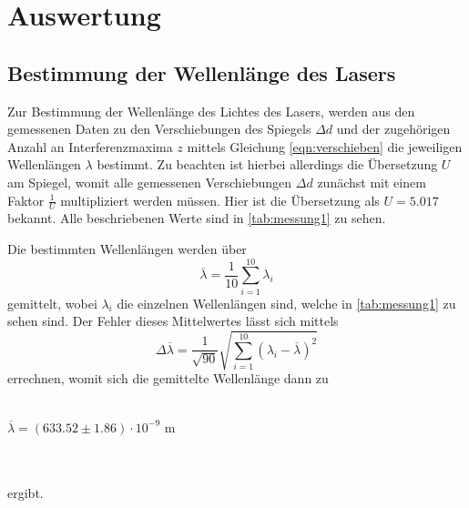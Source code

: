 \section{Auswertung}
\label{sec:Auswertung}
    \subsection{Bestimmung der Wellenlänge des Lasers}
        Zur Bestimmung der Wellenlänge des Lichtes des Lasers, werden aus den gemessenen Daten zu den Verschiebungen des Spiegels 
        $\Delta d$ und der zugehörigen Anzahl an Interferenzmaxima $z$ mittels Gleichung \eqref{eqn:verschieben} die jeweiligen 
        Wellenlängen $\lambda$ bestimmt. Zu beachten ist hierbei allerdings die Übersetzung $U$ am Spiegel, womit alle gemessenen Verschiebungen
        $\Delta d$ zunächst mit einem Faktor $\frac{1}{U}$ multipliziert werden müssen. Hier ist die Übersetzung als $U = 5.017$ bekannt.
        Alle beschriebenen Werte sind in \autoref{tab:messung1} zu sehen.
        
        Die bestimmten Wellenlängen werden über 
        \begin{equation}
        \label{eqn:mittellung}
            \overline{\lambda} = \frac{1}{10} \sum_{i = 1}^{10} \lambda_{i}
        \end{equation}
        gemittelt, wobei $\lambda_{i}$ die einzelnen Wellenlängen sind, welche in \autoref{tab:messung1} zu sehen sind.
        Der Fehler dieses Mittelwertes lässt sich mittels 
        \begin{equation}
        \label{eqn:fehler_mittel}
            \Delta \overline{\lambda} = \frac{1}{\sqrt{90}} \sqrt{\sum_{i=1}^{10} (\lambda_i - \overline{\lambda})^2}
        \end{equation}    
        errechnen, womit sich die gemittelte Wellenlänge dann zu 
        \\ \\
        \centerline{$\overline{\lambda} = (633.52 \pm 1.86) \cdot 10^{-9} $ m}
        \\ \\
        ergibt.
